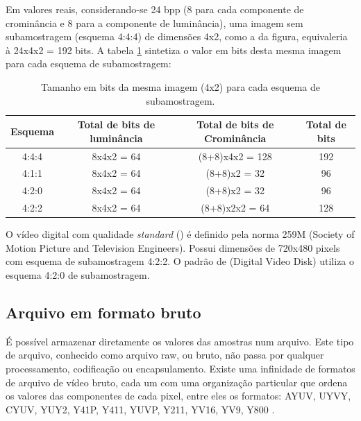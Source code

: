 Em valores reais, considerando-se 24 bpp (8 para cada componente de crominância e 8 para a componente de luminância), uma imagem sem subamostragem (esquema 4:4:4) de dimensões 4x2, como a da figura, equivaleria à 24x4x2 = 192 bits. A tabela \ref{tab:subsampling}  sintetiza o valor em bits desta mesma imagem para cada esquema de subamostragem:

\begin{table}[!h]
	\centering
	\caption[Tamanho em bits para cada subamostragem]{Tamanho em bits da mesma imagem (4x2) para cada esquema de subamostragem.}
	\label{tab:subsampling}
	\begin{tabular}{|c|c|c|c|}
		\hline
		Esquema & Total de bits de luminância & Total de bits de Crominância & Total de bits \\
	    \hline
		4:4:4 & 8x4x2 = 64 & (8+8)x4x2 = 128 & 192 \\
	    \hline
		4:1:1 & 8x4x2 = 64 & (8+8)x2 = 32 & 96 \\
	    \hline
		4:2:0 & 8x4x2 = 64 & (8+8)x2 = 32 & 96 \\
	    \hline
		4:2:2 & 8x4x2 = 64 & (8+8)x2x2 = 64 & 128 \\
		\hline
	\end{tabular}
\end{table}

O vídeo digital com qualidade \emph{standard} () é definido pela norma  259M (Society of Motion Picture and Television Engineers). Possui dimensões de 720x480 pixels com esquema de subamostragem 4:2:2. O padrão de  (Digital Video Disk) utiliza o esquema 4:2:0 de subamostragem.

\subsection{Arquivo em formato bruto}

É possível armazenar diretamente os valores das amostras num arquivo. Este tipo de arquivo, conhecido como arquivo raw, ou bruto, não passa por qualquer processamento, codificação ou encapsulamento. Existe uma infinidade de formatos de arquivo de vídeo bruto, cada um com uma organização particular que ordena os valores das componentes de cada pixel, entre eles os formatos: AYUV, UYVY, CYUV, YUY2, Y41P, Y411, YUVP, Y211, YV16, YV9, Y800 \cite{fourccyuv}. %

